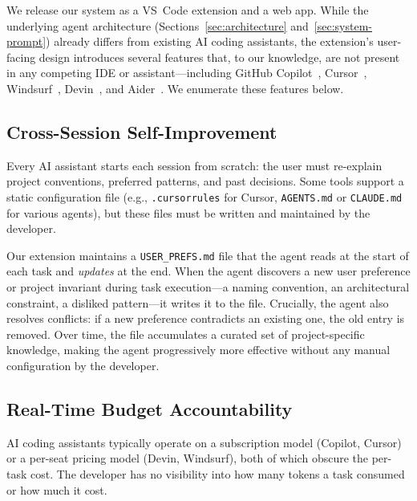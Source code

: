 \documentclass{article}
\begin{document}
We release our system as a VS~Code extension and a web app.  While the underlying agent architecture (Sections~\ref{sec:architecture} and~\ref{sec:system-prompt}) already differs from existing AI coding assistants, the extension's user-facing design introduces several features that, to our knowledge, are not present in any competing IDE or assistant---including GitHub Copilot~\citep{copilot2021}, Cursor~\citep{cursor2024}, Windsurf~\citep{windsurf2024}, Devin~\citep{devin2024}, and Aider~\citep{aider2023}.  We enumerate these features below.

\subsection{Cross-Session Self-Improvement}
\label{sec:self-improvement-feature}

Every AI assistant starts each session from scratch: the user must re-explain project conventions, preferred patterns, and past decisions. Some tools support a static configuration file (e.g., \texttt{.cursorrules} for Cursor, \texttt{AGENTS.md} or \texttt{CLAUDE.md} for various agents), but these files must be written and maintained by the developer.

Our extension maintains a \texttt{USER\_PREFS.md} file that the agent reads at the start of each task and \emph{updates} at the end.  When the agent discovers a new user preference or project invariant during task execution---a naming convention, an architectural constraint, a disliked pattern---it writes it to the file.  Crucially, the agent also resolves conflicts: if a new preference contradicts an existing one, the old entry is removed.  Over time, the file accumulates a curated set of project-specific knowledge, making the agent progressively more effective without any manual configuration by the developer.

\subsection{Real-Time Budget Accountability}
\label{sec:budget-feature}

AI coding assistants typically operate on a subscription model (Copilot, Cursor) or a per-seat pricing model (Devin, Windsurf), both of which obscure the per-task cost.  The developer has no visibility into how many tokens a task consumed or how much it cost.
\end{document}
